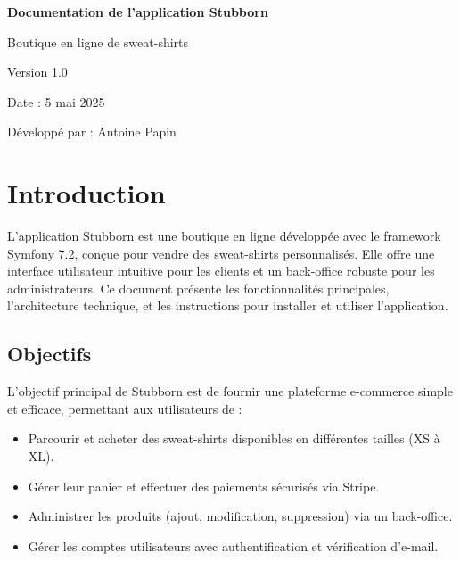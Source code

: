 \documentclass[a4paper,11pt]{article}
\begin{document}
\begin{titlepage}
    \centering
    \vspace*{2cm}
    {\Huge\bfseries Documentation de l'application Stubborn\par}
    \vspace{1cm}
    {\Large Boutique en ligne de sweat-shirts\par}
    \vspace{2cm}
    {\large Version 1.0\par}
    \vspace{0.5cm}
    {\large Date : 5 mai 2025\par}
    \vspace{3cm}
    {\large Développé par : Antoine Papin\par}
    \vfill
\end{titlepage}

\tableofcontents
\newpage

\section{Introduction}
L'application Stubborn est une boutique en ligne développée avec le framework Symfony 7.2, conçue pour vendre des sweat-shirts personnalisés. Elle offre une interface utilisateur intuitive pour les clients et un back-office robuste pour les administrateurs. Ce document présente les fonctionnalités principales, l'architecture technique, et les instructions pour installer et utiliser l'application.

\subsection{Objectifs}
L'objectif principal de Stubborn est de fournir une plateforme e-commerce simple et efficace, permettant aux utilisateurs de :
\begin{itemize}
    \item Parcourir et acheter des sweat-shirts disponibles en différentes tailles (XS à XL).
    \item Gérer leur panier et effectuer des paiements sécurisés via Stripe.
    \item Administrer les produits (ajout, modification, suppression) via un back-office.
    \item Gérer les comptes utilisateurs avec authentification et vérification d'e-mail.
\end{itemize}
\end{document}
